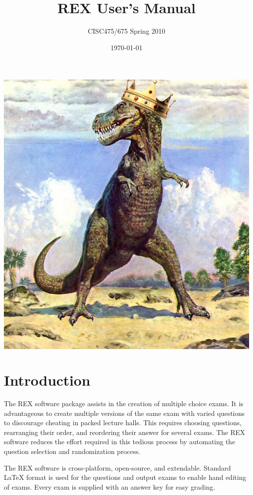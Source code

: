 \documentclass{article}
\author{CISC475/675 Spring 2010}
\title{REX User's Manual}
\date{\today}
\begin{document}
\maketitle
\begin{center}
\includegraphics{rex.png}
\end{center}

\newpage
\tableofcontents
\newpage

\section{Introduction}
The REX software package assists in the creation of multiple choice exams.
It is advantageous to create multiple versions of the same exam with varied
questions to discourage cheating in packed lecture halls. This requires choosing
questions, rearranging their order, and reordering their answer for several
exams. The REX software reduces the effort required in this tedious process by automating the question selection and randomization process.

The REX software is cross-platform, open-source, and extendable. Standard 
\LaTeX{} format is used for the questions and output exams to enable hand editing
of exams. Every exam is supplied with an answer key for easy grading.
\end{document}
